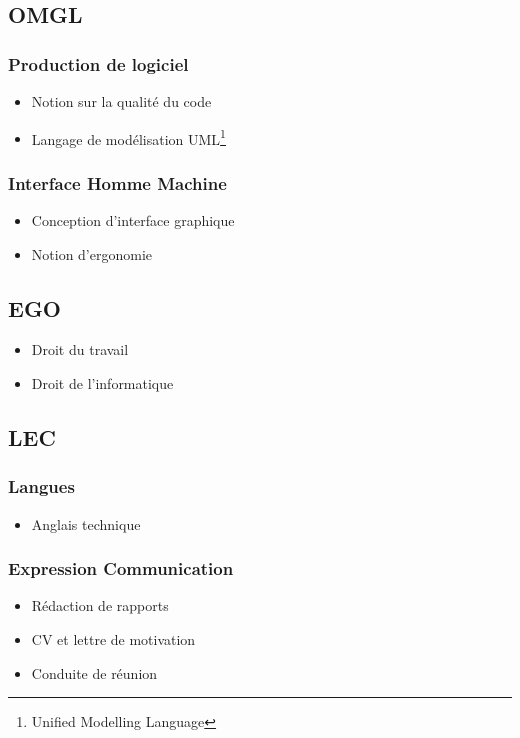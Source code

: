 \documentclass[12pt,a4paper,openany]{article}
\begin{document}
\begin{multicols}{2}
		\subsection{OMGL} 
			\subsubsection{Production de logiciel}
			\begin{itemize}
				\item Notion sur la qualité du code
				\item Langage de modélisation UML\footnote{Unified Modelling Language}
			\end{itemize}
			\subsubsection{Interface Homme Machine}
			\begin{itemize}
				\item Conception d'interface graphique
				\item Notion d'ergonomie
			\end{itemize}
		\subsection{EGO} 
		\begin{itemize}
			\item Droit du travail
			\item Droit de l'informatique
		\end{itemize}
		\subsection{LEC} 
		\subsubsection{Langues}
		\begin{itemize}
			\item Anglais technique
		\end{itemize}
		\subsubsection{Expression Communication}
		\begin{itemize}
			\item Rédaction de rapports
			\item CV et lettre de motivation
			\item Conduite de réunion
		\end{itemize}

\end{multicols}
\end{document}
